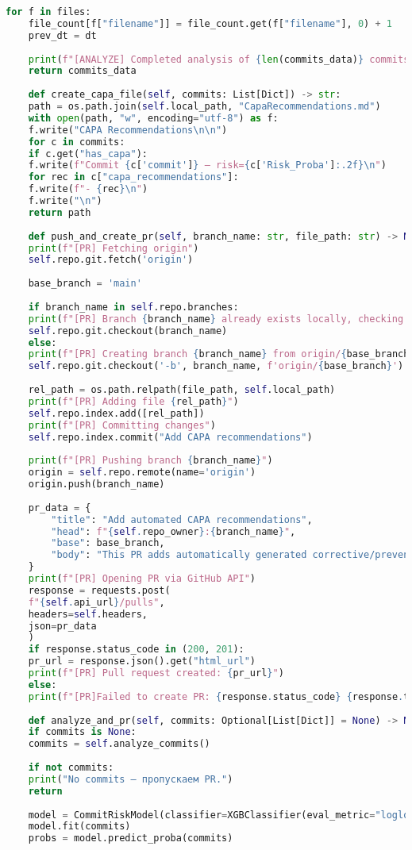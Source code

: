 \begin{lstlisting}[language=Python, caption={{ \texttt{repository\_analysis.py}}}]
	for f in files:
	file_count[f["filename"]] = file_count.get(f["filename"], 0) + 1
	prev_dt = dt
	
	print(f"[ANALYZE] Completed analysis of {len(commits_data)} commits.")
	return commits_data
	
	def create_capa_file(self, commits: List[Dict]) -> str:
	path = os.path.join(self.local_path, "CapaRecommendations.md")
	with open(path, "w", encoding="utf-8") as f:
	f.write("CAPA Recommendations\n\n")
	for c in commits:
	if c.get("has_capa"):
	f.write(f"Commit {c['commit']} — risk={c['Risk_Proba']:.2f}\n")
	for rec in c["capa_recommendations"]:
	f.write(f"- {rec}\n")
	f.write("\n")
	return path
	
	def push_and_create_pr(self, branch_name: str, file_path: str) -> None:
	print(f"[PR] Fetching origin")
	self.repo.git.fetch('origin')
	
	base_branch = 'main'
	
	if branch_name in self.repo.branches:
	print(f"[PR] Branch {branch_name} already exists locally, checking out.")
	self.repo.git.checkout(branch_name)
	else:
	print(f"[PR] Creating branch {branch_name} from origin/{base_branch}")
	self.repo.git.checkout('-b', branch_name, f'origin/{base_branch}')
	
	rel_path = os.path.relpath(file_path, self.local_path)
	print(f"[PR] Adding file {rel_path}")
	self.repo.index.add([rel_path])
	print(f"[PR] Committing changes")
	self.repo.index.commit("Add CAPA recommendations")
	
	print(f"[PR] Pushing branch {branch_name}")
	origin = self.repo.remote(name='origin')
	origin.push(branch_name)
	
	pr_data = {
		"title": "Add automated CAPA recommendations",
		"head": f"{self.repo_owner}:{branch_name}",
		"base": base_branch,
		"body": "This PR adds automatically generated corrective/preventive actions."
	}
	print(f"[PR] Opening PR via GitHub API")
	response = requests.post(
	f"{self.api_url}/pulls",
	headers=self.headers,
	json=pr_data
	)
	if response.status_code in (200, 201):
	pr_url = response.json().get("html_url")
	print(f"[PR] Pull request created: {pr_url}")
	else:
	print(f"[PR]Failed to create PR: {response.status_code} {response.text}")
	
	def analyze_and_pr(self, commits: Optional[List[Dict]] = None) -> None:
	if commits is None:
	commits = self.analyze_commits()
	
	if not commits:
	print("No commits — пропускаем PR.")
	return
	
	model = CommitRiskModel(classifier=XGBClassifier(eval_metric="logloss"))
	model.fit(commits)
	probs = model.predict_proba(commits)
	

\end{lstlisting}
